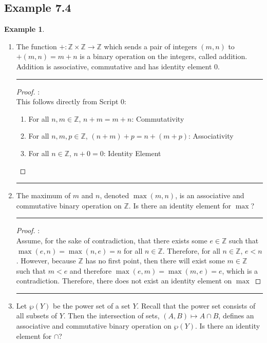 \documentclass[openany, amssymb, psamsfonts]{amsart}
\newcommand{\bbZ}{\mathbb{Z}}
\newcommand{\arr}{\longrightarrow}
\theoremstyle{definition}
\newtheorem{exmp}{Example}[section]
\numberwithin{equation}{section}
\begin{document}
\subsection*{Example 7.4}
\begin{exmp}
\label{7.4}
  \hspace{1in}
	\begin{enumerate}
		\item  The function $+ \colon \bbZ \times \bbZ \arr \bbZ$ which sends a pair of integers $(m, n)$ to $+(m, n) = m + n$ is a binary operation on the integers, called addition.  Addition is associative, commutative and has identity element $0$.
  \vspace{4pt}     \hrule   \vspace{4pt}\begin{proof}:\\
  This follows directly from Script 0:
      \begin{enumerate}
          \item For all $n,m\in \bbZ$, $n+m = m+n$: Commutativity
          \item For all $n,m,p \in \bbZ$, $(n+m)+p = n+ (m + p)$: Associativity
          \item For all $n\in \bbZ$, $n+0 = 0$: Identity Element
      \end{enumerate}
  \end{proof}\vspace{4pt}     \hrule   \vspace{4pt}
		\item  The maximum of $m$ and $n$, denoted $\max(m, n)$, is an associative and commutative binary operation on $\bbZ$.  Is there an identity element for $\max$?
\vspace{4pt}     \hrule   \vspace{4pt} \begin{proof}:\\
Assume, for the sake of contradiction, that there exists some $e\in \bbZ$ such that $\max (e,n) = \max (n,e) = n$ for all $n\in \bbZ$. Therefore, for all $n\in \bbZ$, $e<n$. However, because $\bbZ$ has no first point, then there will exist some $m\in \bbZ$ such that $m<e$ and therefore $\max (e,m) = \max (m,e) = e$, which is a contradiction. Therefore, there does not exist an identity element on $\max$
\end{proof}		
\vspace{4pt}     \hrule   \vspace{4pt}
		\item  Let $\wp(Y)$ be the power set of a set $Y$.  Recall that the power set consists of all subsets of $Y$.  Then the intersection of sets, $(A, B) \mapsto A \cap B$, defines an associative and commutative binary operation on $\wp(Y)$.  Is there an identity element for $\cap$?

\end{enumerate}
\end{exmp}
\end{document}
